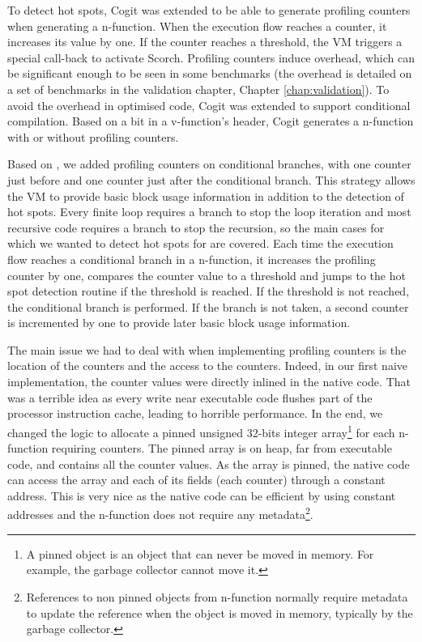 \documentclass[a4paper,12pt,twoside]{../includes/ThesisStyle}
\begin{document}
To detect hot spots, Cogit was extended to be able to generate profiling counters when generating a n-function. When the execution flow reaches a counter, it increases its value by one. If the counter reaches a threshold, the VM triggers a special call-back to activate Scorch. Profiling counters induce overhead, which can be significant enough to be seen in some benchmarks (the overhead is detailed on a set of benchmarks in the validation chapter, Chapter \ref{chap:validation}). To avoid the overhead in optimised code, Cogit was extended to support conditional compilation. Based on a bit in a v-function's header, Cogit generates a n-function with or without profiling counters.

Based on \cite{Arn02}, we added profiling counters on conditional branches, with one counter just before and one counter just after the conditional branch. This strategy allows the VM to provide basic block usage information in addition to the detection of hot spots. Every finite loop requires a branch to stop the loop iteration and most recursive code requires a branch to stop the recursion, so the main cases for which we wanted to detect hot spots for are covered. Each time the execution flow reaches a conditional branch in a n-function, it increases the profiling counter by one, compares the counter value to a threshold and jumps to the hot spot detection routine if the threshold is reached. If the threshold is not reached, the conditional branch is performed. If the branch is not taken, a second counter is incremented by one to provide later basic block usage information.

The main issue we had to deal with when implementing profiling counters is the location of the counters and the access to the counters. Indeed, in our first naive implementation, the counter values were directly inlined in the native code. That was a terrible idea as every write near executable code flushes part of the processor instruction cache, leading to horrible performance. In the end, we changed the logic to allocate a pinned unsigned 32-bits integer array\footnote{A pinned object is an object that can never be moved in memory. For example, the garbage collector cannot move it.} for each n-function requiring counters. The pinned array is on heap, far from executable code, and contains all the counter values. As the array is pinned, the native code can access the array and each of its fields (each counter) through a constant address. This is very nice as the native code can be efficient by using constant addresses and the n-function does not require any metadata\footnote{References to non pinned objects from n-function normally require metadata to update the reference when the object is moved in memory, typically by the garbage collector.}.
\end{document}
